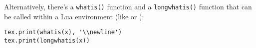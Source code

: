 \documentclass{article}
\begin{document}
Alternatively, there's a \texttt{whatis()} function and a \texttt{longwhatis()} function that can be called within a Lua environment (like \texttt{\directlua} or \texttt{\luaexec}):

\begin{codebox}
\begin{verbatim}
tex.print(whatis(x), '\\newline')
tex.print(longwhatis(x))
\end{verbatim}
\tcblower
{}
\end{codebox}
\end{document}

